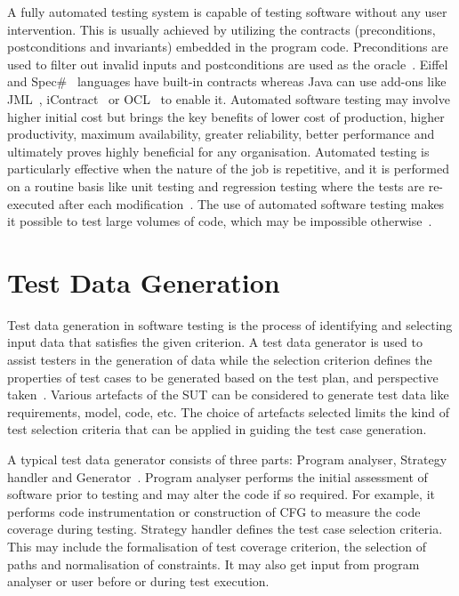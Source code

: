 A fully automated testing system is capable of testing software without any user intervention. This is usually achieved by utilizing the contracts (preconditions, postconditions and invariants) embedded in the program code. Preconditions are used to filter out invalid inputs and postconditions are used as the oracle~\cite{leitner2007reconciling}. Eiffel~\cite{ecma2005367} and Spec\#~\cite{barnett2005spec} languages have built-in contracts whereas Java can use add-ons like JML~\cite{leavensjml}, iContract~\cite{kramer1998icontract} or OCL~\cite{richters1998formalizing} to enable it. 
Automated software testing may involve higher initial cost but brings the key benefits of lower cost of production, higher productivity, maximum availability, greater reliability, better performance and ultimately proves highly beneficial for any organisation. Automated testing is particularly effective when the nature of the job is repetitive, and it is performed on a routine basis like unit testing and regression testing where the tests are re-executed after each modification~\cite{huang2003automated}. The use of automated software testing makes it possible to test large volumes of code, which may be impossible otherwise~\cite{ramamoorthy1975testing}.

\section{Test Data Generation}
Test data generation in software testing is the process of identifying and selecting input data that satisfies the given criterion. A test data generator is used to assist testers in the generation of data while the selection criterion defines the properties of test cases to be generated based on the test plan, and perspective taken~\cite{korel1990automated}. Various artefacts of the SUT can be considered to generate test data like requirements, model, code, etc. The choice of artefacts selected limits the kind of test selection criteria that can be applied in guiding the test case generation. 

A typical test data generator consists of three parts: Program analyser, Strategy handler and Generator~\cite{edvardsson1999survey}. Program analyser performs the initial assessment of software prior to testing and may alter the code if so required. For example, it performs code instrumentation or construction of CFG to measure the code coverage during testing. Strategy handler defines the test case selection criteria. This may include the formalisation of test coverage criterion, the selection of paths and normalisation of constraints. It may also get input from program analyser or user before or during test execution.

